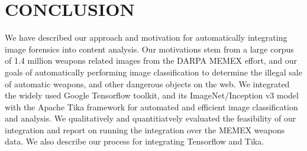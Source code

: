 \section{CONCLUSION} \label{sec:future}
We have described our approach and motivation for automatically integrating image forensics into content analysis. Our motivations stem from a large corpus of 1.4 million weapons related images from the DARPA MEMEX effort, and our goals of automatically performing image classification to determine the illegal sale of automatic weapons, and other dangerous objects on the web. We integrated the widely used Google Tensorflow toolkit, and its ImageNet/Inception v3 model with the Apache Tika framework for automated and efficient image classification and analysis. We qualitatively and quantitiatvely evaluated the feasibility of our integration and report on running the integration over the MEMEX weapons data. We also describe our process for integrating Tensorflow and Tika. 
